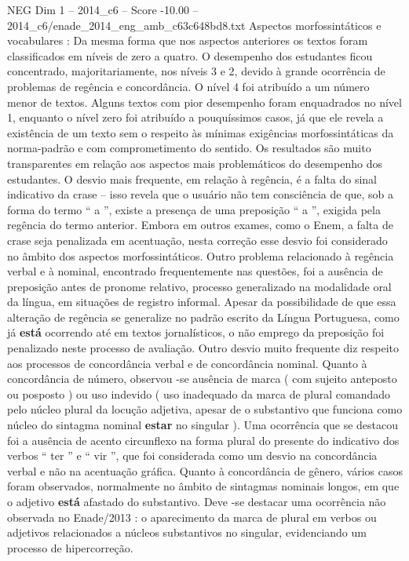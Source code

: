 \begin{textsample}{NEG Dim 1 – 2014\_c6 – Score -10.00 – 2014\_c6/enade\_2014\_eng\_amb\_c63c648bd8.txt}
Aspectos morfossintáticos e vocabulares : Da mesma forma que nos aspectos anteriores os textos foram classificados em níveis de zero a quatro.
O desempenho dos estudantes ficou concentrado, majoritariamente, nos níveis 3 e 2, devido à grande ocorrência de problemas de regência e concordância.
O nível 4 foi atribuído a um número menor de textos.
Alguns textos com pior desempenho foram enquadrados no nível 1, enquanto o nível zero foi atribuído a pouquíssimos casos, já que ele revela a existência de um texto sem o respeito às mínimas exigências morfossintáticas da norma-padrão e com comprometimento do sentido.
Os resultados são muito transparentes em relação aos aspectos mais problemáticos do desempenho dos estudantes.
O desvio mais frequente, em relação à regência, é a falta do sinal indicativo da crase – isso revela que o usuário não tem consciência de que, sob a forma do termo “ a ”, existe a presença de uma preposição “ a ”, exigida pela regência do termo anterior.
Embora em outros exames, como o Enem, a falta de crase seja penalizada em acentuação, nesta correção esse desvio foi considerado no âmbito dos aspectos morfossintáticos.
Outro problema relacionado à regência verbal e à nominal, encontrado frequentemente nas questões, foi a ausência de preposição antes de pronome relativo, processo generalizado na modalidade oral da língua, em situações de registro informal.
Apesar da possibilidade de que essa alteração de regência se generalize no padrão escrito da Língua Portuguesa, como já \textbf{está} ocorrendo até em textos jornalísticos, o não emprego da preposição foi penalizado neste processo de avaliação.
Outro desvio muito frequente diz respeito aos processos de concordância verbal e de concordância nominal.
Quanto à concordância de número, observou -se ausência de marca ( com sujeito anteposto ou posposto ) ou uso indevido ( uso inadequado da marca de plural comandado pelo núcleo plural da locução adjetiva, apesar de o substantivo que funciona como núcleo do sintagma nominal \textbf{estar} no singular ).
Uma ocorrência que se destacou foi a ausência de acento circunflexo na forma plural do presente do indicativo dos verbos “ ter ” e “ vir ”, que foi considerada como um desvio na concordância verbal e não na acentuação gráfica.
Quanto à concordância de gênero, vários casos foram observados, normalmente no âmbito de sintagmas nominais longos, em que o adjetivo \textbf{está} afastado do substantivo.
Deve -se destacar uma ocorrência não observada no Enade/2013 : o aparecimento da marca de plural em verbos ou adjetivos relacionados a núcleos substantivos no singular, evidenciando um processo de hipercorreção.

\end{textsample}
